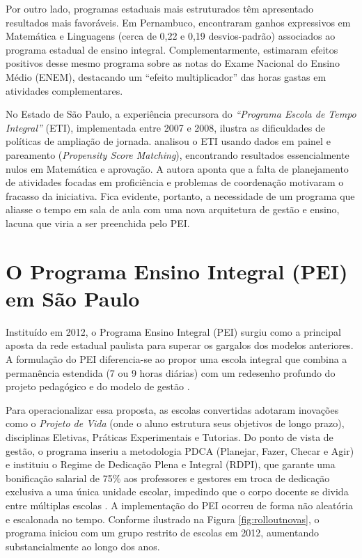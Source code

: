 Por outro lado, programas estaduais mais estruturados têm apresentado resultados mais favoráveis. Em Pernambuco, \textcite{Pernambuco} encontraram ganhos expressivos em Matemática e Linguagens (cerca de 0,22 e 0,19 desvios-padrão) associados ao programa estadual de ensino integral. Complementarmente, \textcite{araujo2020_pernambuco_impacto_enem} estimaram efeitos positivos desse mesmo programa sobre as notas do Exame Nacional do Ensino Médio (ENEM), destacando um ``efeito multiplicador'' das horas gastas em atividades complementares.

No Estado de São Paulo, a experiência precursora do \textit{``Programa Escola de Tempo Integral''} (ETI), implementada entre 2007 e 2008, ilustra as dificuldades de políticas de ampliação de jornada. \textcite{aquino2011_eti_2007_2008_psm_painel} analisou o ETI usando dados em painel e pareamento (\textit{Propensity Score Matching}), encontrando resultados essencialmente nulos em Matemática e aprovação. A autora aponta que a falta de planejamento de atividades focadas em proficiência e problemas de coordenação motivaram o fracasso da iniciativa. Fica evidente, portanto, a necessidade de um programa que aliasse o tempo em sala de aula com uma nova arquitetura de gestão e ensino, lacuna que viria a ser preenchida pelo PEI.

\section{O Programa Ensino Integral (PEI) em São Paulo} \label{sec:peisaopaulo}

Instituído em 2012, o Programa Ensino Integral (PEI) surgiu como a principal aposta da rede estadual paulista para superar os gargalos dos modelos anteriores. A formulação do PEI diferencia-se ao propor uma escola integral que combina a permanência estendida (7 ou 9 horas diárias) com um redesenho profundo do projeto pedagógico e do modelo de gestão \cite{sao_paulo_pei_2012}.

Para operacionalizar essa proposta, as escolas convertidas adotaram inovações como o \textit{Projeto de Vida} (onde o aluno estrutura seus objetivos de longo prazo), disciplinas Eletivas, Práticas Experimentais e Tutorias. Do ponto de vista de gestão, o programa inseriu a metodologia PDCA (Planejar, Fazer, Checar e Agir) e instituiu o Regime de Dedicação Plena e Integral (RDPI), que garante uma bonificação salarial de 75\% aos professores e gestores em troca de dedicação exclusiva a uma única unidade escolar, impedindo que o corpo docente se divida entre múltiplas escolas \cite{sao_paulo_pei_2012}. A implementação do PEI ocorreu de forma não aleatória e escalonada no tempo. Conforme ilustrado na Figura \ref{fig:rolloutnovas}, o programa iniciou com um grupo restrito de escolas em 2012, aumentando substancialmente ao longo dos anos. 

